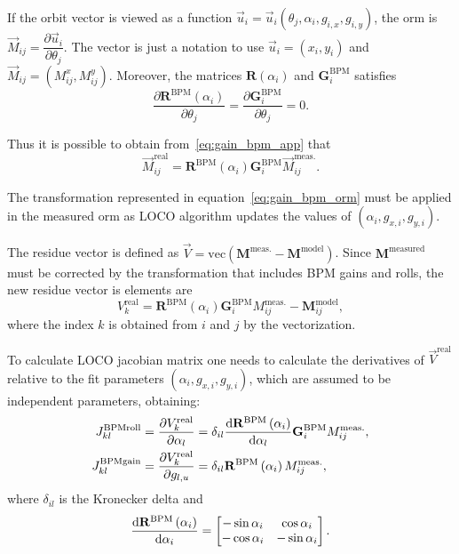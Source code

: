 If the orbit vector is viewed as a function $\vec{u}_i = \vec{u}_i\left(\theta_j, \alpha_i, g_{i, x}, g_{i, y}\right)$, the \gls{orm} is $\vec{M}_{ij} = \dfrac{\partial \vec{u}_i}{\partial \theta_j}$. The vector is just a notation to use $\vec{u}_i = (x_i, y_i)$ and $\vec{M}_{ij} = \left(M_{ij}^x, M_{ij}^y\right)$. Moreover, the matrices $\mathbf{R}\left(\alpha_i\right)$ and $\mathbf{G}_{i}^{\mathrm{BPM}}$ satisfies
\begin{equation*}
\dfrac{\partial \mathbf{R}^\mathrm{BPM}\left(\alpha_i\right)}{ \partial  \theta_j} = \dfrac{\partial \mathbf{G}_{i}^{\mathrm{BPM}}}{ \partial \theta_j} = 0.
\end{equation*}

Thus it is possible to obtain from~\eqref{eq:gain_bpm_app} that
\begin{equation}
    \vec{M}_{ij}^{\mathrm{real}} = \mathbf{R}^\mathrm{BPM}\left(\alpha_i\right) \mathbf{G}_{i}^{\mathrm{BPM}} \vec{M}_{ij}^{\mathrm{meas.}}.
    \label{eq:gain_bpm_orm}
\end{equation}

The transformation represented in equation~\eqref{eq:gain_bpm_orm} must be applied in the measured \gls{orm} as LOCO algorithm updates the values of $\left(\alpha_i, g_{x, i}, g_{y, i}\right)$. 

The residue vector is defined as $\vec{V} = \mathrm{vec}\left(\mathbf{M}^{\mathrm{meas.}} - \mathbf{M}^{\mathrm{model}}\right)$. Since $\mathbf{M}^{\mathrm{measured}}$ must be corrected by the transformation that includes BPM gains and rolls, the new residue vector is elements are 
\begin{equation}
    {V}_k^{\mathrm{real}} = \mathbf{R}^\mathrm{BPM}\left(\alpha_i\right) \mathbf{G}_{i}^{\mathrm{BPM}} {M}^{\mathrm{meas.}}_{ij} - \mathbf{M}^{\mathrm{model}}_{ij},
\end{equation}
where the index $k$ is obtained from $i$ and $j$ by the vectorization. 

To calculate LOCO jacobian matrix one needs to calculate the derivatives of $\vec{V}^{\mathrm{real}}$ relative to the fit parameters $\left(\alpha_i, g_{x, i}, g_{y, i}\right)$, which are assumed to be independent parameters, obtaining:
\begin{align}
    J_{kl}^{\mathrm{BPMroll}} = \dfrac{\partial {V}_k^{\mathrm{real}}}{\partial \alpha_l} &= \delta_{il}\dfrac{\mathrm{d} \mathbf{R}^\mathrm{BPM}\left(\alpha_i\right)}{\mathrm{d} \alpha_l} \mathbf{G}_{i}^{\mathrm{BPM}} {M}^{\mathrm{meas.}}_{ij}, \\
    J_{kl}^{\mathrm{BPMgain}} = \dfrac{\partial {V}_k^{\mathrm{real}}}{\partial g_{l, u}} &= \delta_{il}\mathbf{R}^\mathrm{BPM}\left(\alpha_i\right){M}^{\mathrm{meas.}}_{ij},
\end{align}
where $\delta_{il}$ is the Kronecker delta and 
\begin{equation*}
    \dfrac{\mathrm{d} \mathbf{R}^\mathrm{BPM}\left(\alpha_i\right)}{\mathrm{d} \alpha_i} =
    \begin{bmatrix}
    -\sin\alpha_i & \cos\alpha_i \\
     -\cos\alpha_i & -\sin\alpha_i 
    \end{bmatrix}.
\end{equation*}

